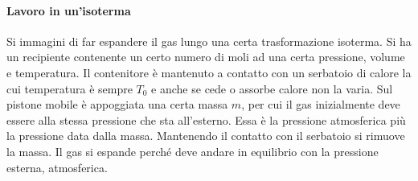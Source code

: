 \documentclass[10pt,a4paper]{book}
\begin{document}
\paragraph{Lavoro in un'isoterma} Si immagini di far espandere il gas lungo una certa trasformazione isoterma. Si ha un recipiente contenente un certo numero di moli ad una certa pressione, volume e temperatura. Il contenitore è mantenuto a contatto con un serbatoio di calore la cui temperatura è sempre $T_0$ e anche se cede o assorbe calore non la varia. Sul pistone mobile è appoggiata una certa massa $m$, per cui il gas inizialmente deve essere alla stessa pressione che sta all'esterno. Essa è la pressione atmosferica più la pressione data dalla massa. Mantenendo il contatto con il serbatoio si rimuove la massa. Il gas si espande perché deve andare in equilibrio con la pressione esterna,  atmosferica.
\end{document}

